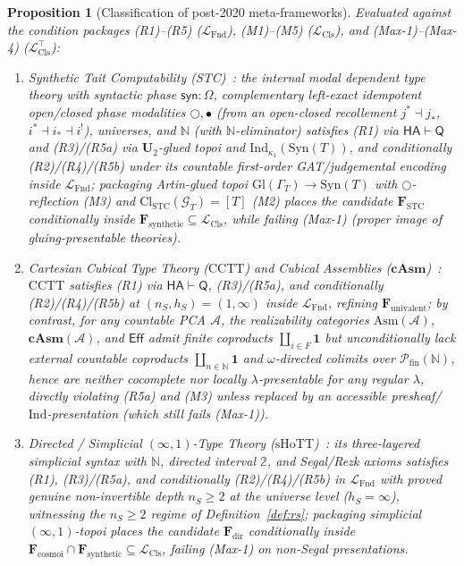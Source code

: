 \documentclass[11pt]{article}
\theoremstyle{plain}
\newtheorem{proposition}[theorem]{Proposition}
\theoremstyle{definition}
\newcommand{\LFnd}{\mathcal{L}_{\mathrm{Fnd}}}
\newcommand{\LCls}{\mathcal{L}_{\mathrm{Cls}}}
\newcommand{\LClsMax}{\mathcal{L}_{\mathrm{Cls}}^{\top}}
\newcommand{\Cl}{\mathrm{Cl}}
\newcommand{\Syn}{\mathrm{Syn}}
\newcommand{\Eff}{\ensuremath{\mathsf{Eff}}}
\begin{document}
\begin{proposition}[Classification of post-2020 meta-frameworks]\label{prop:q2-candidates}
Evaluated against the condition packages (R1)--(R5) ($\LFnd$), (M1)--(M5) ($\LCls$), and (Max-1)--(Max-4) ($\LClsMax$):
\begin{enumerate}[nosep,label=(\roman*)]
\item \emph{Synthetic Tait Computability (STC)}~\cite{Sterling2021}: the internal modal dependent type theory with syntactic phase $\mathsf{syn}:\Omega$, complementary left-exact idempotent open/closed phase modalities $\bigcirc, \bullet$ (from an open-closed recollement $j^* \dashv j_*$, $i^* \dashv i_* \dashv i^!$), universes, and $\mathbb{N}$ (with $\mathbb{N}$-eliminator) satisfies (R1) via $\mathsf{HA} \vdash \mathsf{Q}$ and (R3)/(R5a) via $\mathbf{U}_2$-glued topoi and $\mathrm{Ind}_{\kappa_1}(\Syn(T))$, and conditionally (R2)/(R4)/(R5b) under its countable first-order GAT/judgemental encoding inside $\LFnd$; packaging Artin-glued topoi $\mathrm{Gl}(\Gamma_T)\to\Syn(T)$ with $\bigcirc$-reflection (M3) and $\Cl_{\mathrm{STC}}(\mathcal{G}_T)=[T]$ (M2) places the candidate $\mathbf{F}_{\mathrm{STC}}$ conditionally inside $\mathbf{F}_{\mathrm{synthetic}}\subseteq\LCls$, while failing (Max-1) (proper image of gluing-presentable theories).
\item \emph{Cartesian Cubical Type Theory ($\mathrm{CCTT}$) and Cubical Assemblies ($\mathbf{cAsm}$)}~\cite{AngiuliEtAl2021,Swan2018}: $\mathrm{CCTT}$ satisfies (R1) via $\mathsf{HA} \vdash \mathsf{Q}$, (R3)/(R5a), and conditionally (R2)/(R4)/(R5b) at $(n_S, h_S) = (1, \infty)$ inside $\LFnd$, refining $\mathbf{F}_{\mathrm{univalent}}$; by contrast, for any countable PCA $\mathcal{A}$, the realizability categories $\mathrm{Asm}(\mathcal{A})$, $\mathbf{cAsm}(\mathcal{A})$, and $\Eff$ admit finite coproducts $\coprod_{i \in F}\mathbf{1}$ but unconditionally lack external countable coproducts $\coprod_{n \in \mathbb{N}}\mathbf{1}$ and $\omega$-directed colimits over $\mathcal{P}_{\mathrm{fin}}(\mathbb{N})$, hence are neither cocomplete nor locally $\lambda$-presentable for any regular $\lambda$, directly violating (R5a) and (M3) unless replaced by an accessible presheaf/$\mathrm{Ind}$-presentation (which still fails (Max-1)).
\item \emph{Directed / Simplicial $(\infty, 1)$-Type Theory ($\mathrm{sHoTT}$)}~\cite{RiehlShulman2017}: its three-layered simplicial syntax with $\mathbb{N}$, directed interval $\mathbb{2}$, and Segal/Rezk axioms satisfies (R1), (R3)/(R5a), and conditionally (R2)/(R4)/(R5b) in $\LFnd$ with proved genuine non-invertible depth $n_S \ge 2$ at the universe level ($h_S = \infty$), witnessing the $n_S \ge 2$ regime of Definition~\ref{def:rs}; packaging simplicial $(\infty,1)$-topoi places the candidate $\mathbf{F}_{\mathrm{dir}}$ conditionally inside $\mathbf{F}_{\mathrm{cosmoi}} \cap \mathbf{F}_{\mathrm{synthetic}} \subseteq \LCls$, failing (Max-1) on non-Segal presentations.
\end{enumerate}
\end{proposition}
\end{document}
